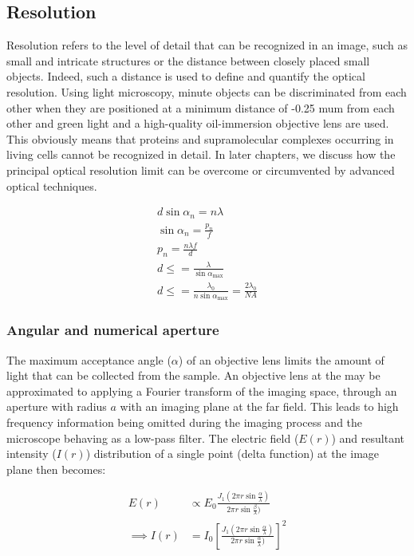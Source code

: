 \subsection{Resolution}


Resolution refers to the level of detail that can be recognized in an image, such as small and intricate structures or the distance between closely placed small objects.
Indeed, such a distance is used to define and quantify the optical resolution.
Using light microscopy, minute objects can be discriminated from each other when they are positioned at a minimum distance of -0.25 mum from each other and green light and a high-quality oil-immersion objective lens are used.
This obviously means that proteins and supramolecular complexes occurring in living cells cannot be recognized in detail.
In later chapters, we discuss how the principal optical resolution limit can be overcome or circumvented by advanced optical techniques.

%

\begin{align}
    d \sin \alpha_n = n \lambda \\
    \sin\alpha_n = \frac{p_n}{f} \\
    p_n = \frac{n\lambda f}{d} \\
    d \le = \frac{\lambda}{\sin\alpha_{\text{max}}} \\
    d \le = \frac{\lambda_0}{n\sin\alpha_{\text{max}}} = \frac{2\lambda_0}{NA}
\end{align}

\subsubsection{Angular and numerical aperture}

The maximum acceptance angle ($\alpha$) of an objective lens limits the amount of light that can be collected from the sample.
An objective lens at the may be approximated to applying a Fourier transform of the imaging space, through an aperture with radius $a$ with an imaging plane at the far field.
This leads to high frequency information being omitted during the imaging process and the microscope behaving as a low-pass filter.
The electric field ($E(r)$) and resultant intensity ($I(r)$) distribution of a single point (delta function) at the image plane then becomes:

\begin{align}
    E(r) &\propto E_0 \frac{J_1 \left(2\pi r \sin \frac{\alpha}{\lambda}\right)}{2\pi r \sin \frac{\beta}{\lambda})}\\
    \implies
    I(r) &= I_0 \left[\frac{J_1 \left(2\pi r \sin \frac{\alpha}{\lambda}\right)}{2\pi r \sin \frac{\alpha}{\lambda})}\right]^2
\end{align}

